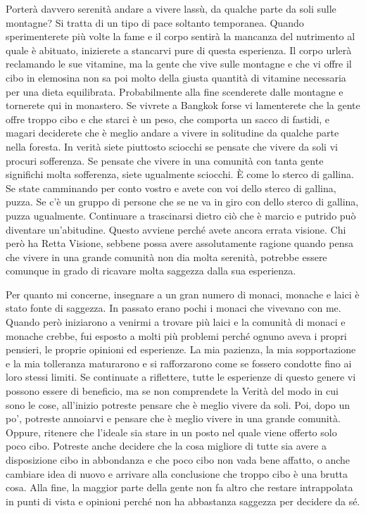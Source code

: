 Porterà davvero serenità andare a vivere lassù, da qualche parte da soli
sulle montagne? Si tratta di un tipo di pace soltanto temporanea. Quando
sperimenterete più volte la fame e il corpo sentirà la mancanza del
nutrimento al quale è abituato, inizierete a stancarvi pure di questa
esperienza. Il corpo urlerà reclamando le sue vitamine, ma la gente che
vive sulle montagne e che vi offre il cibo in elemosina non sa poi molto
della giusta quantità di vitamine necessaria per una dieta equilibrata.
Probabilmente alla fine scenderete dalle montagne e tornerete qui in
monastero. Se vivrete a Bangkok forse vi lamenterete che la gente offre
troppo cibo e che starci è un peso, che comporta un sacco di fastidi, e
magari deciderete che è meglio andare a vivere in solitudine da qualche
parte nella foresta. In verità siete piuttosto sciocchi se pensate che
vivere da soli vi procuri sofferenza. Se pensate che vivere in una
comunità con tanta gente significhi molta sofferenza, siete ugualmente
sciocchi. È come lo sterco di gallina. Se state camminando per conto
vostro e avete con voi dello sterco di gallina, puzza. Se c'è un gruppo
di persone che se ne va in giro con dello sterco di gallina, puzza
ugualmente. Continuare a trascinarsi dietro ciò che è marcio e putrido
può diventare un'abitudine. Questo avviene perché avete ancora errata
visione. Chi però ha Retta Visione, sebbene possa avere assolutamente
ragione quando pensa che vivere in una grande comunità non dia molta
serenità, potrebbe essere comunque in grado di ricavare molta saggezza
dalla sua esperienza.

Per quanto mi concerne, insegnare a un gran numero di monaci, monache e
laici è stato fonte di saggezza. In passato erano pochi i monaci che
vivevano con me. Quando però iniziarono a venirmi a trovare più laici e
la comunità di monaci e monache crebbe, fui esposto a molti più problemi
perché ognuno aveva i propri pensieri, le proprie opinioni ed
esperienze. La mia pazienza, la mia sopportazione e la mia tolleranza
maturarono e si rafforzarono come se fossero condotte fino ai loro
stessi limiti. Se continuate a riflettere, tutte le esperienze di questo
genere vi possono essere di beneficio, ma se non comprendete la Verità
del modo in cui sono le cose, all'inizio potreste pensare che è meglio
vivere da soli. Poi, dopo un po', potreste annoiarvi e pensare che è
meglio vivere in una grande comunità. Oppure, ritenere che l'ideale sia
stare in un posto nel quale viene offerto solo poco cibo. Potreste anche
decidere che la cosa migliore di tutte sia avere a disposizione cibo in
abbondanza e che poco cibo non vada bene affatto, o anche cambiare idea
di nuovo e arrivare alla conclusione che troppo cibo è una brutta cosa.
Alla fine, la maggior parte della gente non fa altro che restare
intrappolata in punti di vista e opinioni perché non ha abbastanza
saggezza per decidere da sé.


